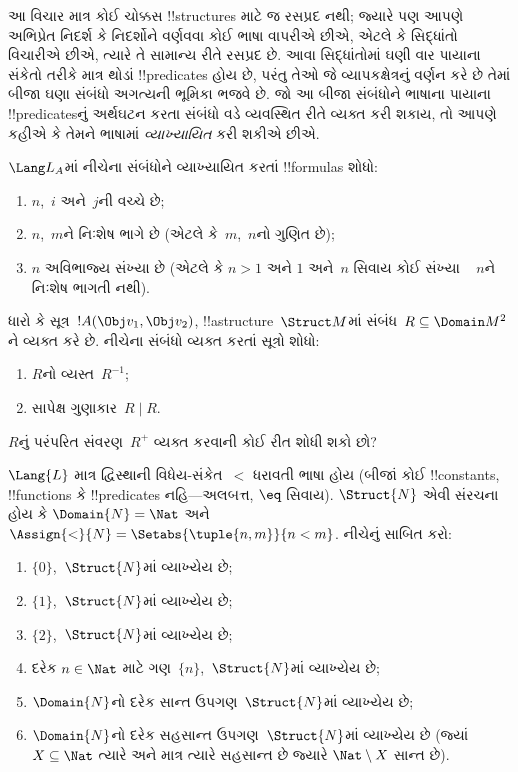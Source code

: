 \documentclass[../../../include/open-logic-section]{subfiles}
\begin{document}
\begin{explain}
આ વિચાર માત્ર કોઈ ચોક્કસ !!{structure}s માટે જ રસપ્રદ નથી; જ્યારે પણ
આપણે અભિપ્રેત નિદર્શ કે નિદર્શોને વર્ણવવા કોઈ ભાષા વાપરીએ છીએ, એટલે
કે સિદ્ધાંતો વિચારીએ છીએ, ત્યારે તે સામાન્ય રીતે રસપ્રદ છે. આવા
સિદ્ધાંતોમાં ઘણી વાર પાયાના સંકેતો તરીકે માત્ર થોડાં !!{predicate}s
હોય છે, પરંતુ તેઓ જે વ્યાપકક્ષેત્રનું વર્ણન કરે છે તેમાં બીજા ઘણા
સંબંધો અગત્યની ભૂમિકા ભજવે છે. જો આ બીજા સંબંધોને ભાષાના પાયાના
!!{predicate}sનું અર્થઘટન કરતા સંબંધો વડે વ્યવસ્થિત રીતે વ્યક્ત કરી
શકાય, તો આપણે કહીએ કે તેમને ભાષામાં \emph{વ્યાખ્યાયિત} કરી શકીએ છીએ.
\end{explain}

\begin{prob}
$\Lang L_A$માં નીચેના સંબંધોને વ્યાખ્યાયિત કરતાં !!{formula}s શોધો:
\begin{enumerate}
\item $n$,~$i$ અને~$j$ની વચ્ચે છે;
\item $n$,~$m$ને નિઃશેષ ભાગે છે (એટલે કે~$m$,~$n$નો ગુણિત છે);
\item $n$ અવિભાજ્ય સંખ્યા છે (એટલે કે $n>1$ અને $1$ અને~$n$ સિવાય કોઈ સંખ્યા
  ~ $n$ને નિઃશેષ ભાગતી નથી).
\end{enumerate}
\end{prob}


\begin{prob}
ધારો કે સૂત્ર~$!A(\Obj v_1,\Obj v_2)$, !!a{structure}~$\Struct M$માં
સંબંધ~$R\subseteq\Domain M^2$ને વ્યક્ત કરે છે. નીચેના સંબંધો વ્યક્ત
કરતાં સૂત્રો શોધો:
\begin{enumerate}
\item $R$નો વ્યસ્ત~$R^{-1}$;
\item સાપેક્ષ ગુણાકાર~$R\mid R$.
\end{enumerate}
$R$નું પરંપરિત સંવરણ~$R^+$ વ્યક્ત કરવાની કોઈ રીત શોધી શકો છો?
\end{prob}

\begin{prob}
$\Lang{L}$ માત્ર દ્વિસ્થાની વિધેય-સંકેત~$<$ ધરાવતી ભાષા હોય (બીજાં
કોઈ !!{constant}s, !!{function}s કે !!{predicate}s નહિ---અલબત્ત,
$\eq$ સિવાય). $\Struct{N}$ એવી સંરચના હોય કે $\Domain{N}=\Nat$ અને
$\Assign{<}{N}=\Setabs{\tuple{n,m}}{n<m}$. નીચેનું સાબિત કરો:
\begin{enumerate}
\item $\{0\}$,~$\Struct{N}$માં વ્યાખ્યેય છે;
\item $\{1\}$,~$\Struct{N}$માં વ્યાખ્યેય છે;
\item $\{2\}$,~$\Struct{N}$માં વ્યાખ્યેય છે;
\item દરેક $n\in\Nat$ માટે ગણ~$\{n\}$,~$\Struct{N}$માં વ્યાખ્યેય છે;
\item $\Domain{N}$નો દરેક સાન્ત ઉપગણ~$\Struct{N}$માં વ્યાખ્યેય છે;
\item $\Domain{N}$નો દરેક સહસાન્ત ઉપગણ~$\Struct{N}$માં વ્યાખ્યેય છે
  (જ્યાં $X\subseteq\Nat$ ત્યારે અને માત્ર ત્યારે સહસાન્ત છે જ્યારે
  $\Nat\setminus X$ સાન્ત છે).
\end{enumerate}
\end{prob}
\end{document}
